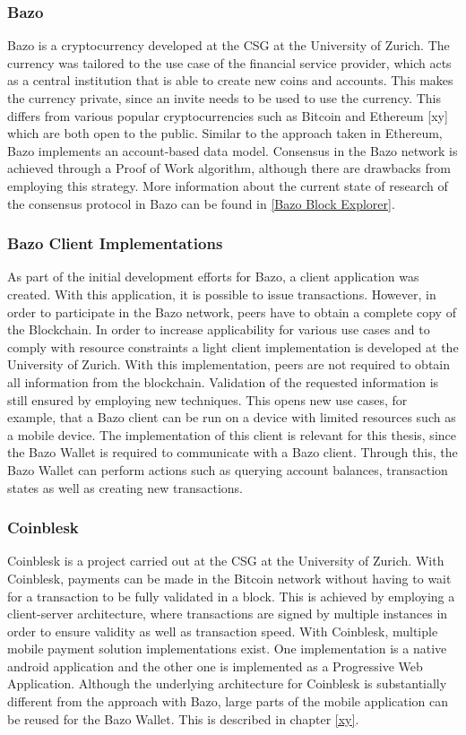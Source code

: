 \documentclass[a4paper]{article}
\begin{document}
\subsubsection{Bazo}
Bazo is a cryptocurrency developed at the CSG at the University of Zurich. The currency was tailored to the use case of the financial service provider, which acts as a central institution that is able to create new coins and accounts. This makes the currency private, since an invite needs to be used to use the currency. This differs from various popular cryptocurrencies such as Bitcoin and Ethereum [xy] which are both open to the public. Similar to the approach taken in Ethereum, Bazo implements an account-based data model. Consensus in the Bazo network is achieved through a Proof of Work algorithm, although there are drawbacks from employing this strategy. More information about the current state of research of the consensus protocol in Bazo can be found in \ref{Bazo Block Explorer}.

\subsubsection{Bazo Client Implementations}
As part of the initial development efforts for Bazo, a client application was created. With this application, it is possible to issue transactions. However, in order to participate in the Bazo network, peers have to obtain a complete copy of the Blockchain. In order to increase applicability for various use cases and to comply with resource constraints a light client implementation is developed at the University of Zurich. With this implementation, peers are not required to obtain all information from the blockchain. Validation of the requested information is still ensured by employing new techniques. This opens new use cases, for example, that a Bazo client can be run on a device with limited resources such as a mobile device.
The implementation of this client is relevant for this thesis, since the Bazo Wallet is required to communicate with a Bazo client. Through this, the Bazo Wallet can perform actions such as querying account balances, transaction states as well as creating new transactions.
\subsubsection{Coinblesk}
Coinblesk is a project carried out at the CSG at the University of Zurich. With Coinblesk, payments can be made in the Bitcoin network without having to wait for a transaction to be fully validated in a block. This is achieved by employing a client-server architecture, where transactions are signed by multiple instances in order to ensure validity as well as transaction speed.
With Coinblesk, multiple mobile payment solution implementations exist. One implementation is a native android application and the other one is implemented as a Progressive Web Application. Although the underlying architecture for Coinblesk is substantially different from the approach with Bazo, large parts of the mobile application can be reused for the Bazo Wallet. This is described in chapter \ref{xy}.
\end{document}
